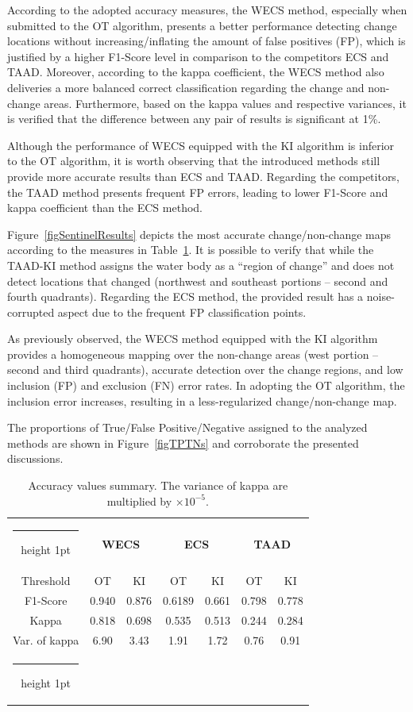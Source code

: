 \documentclass[journal]{IEEEtran}
\makeatletter
\newcommand{\thickhline}{\noalign {\ifnum 0=`}\fi \hrule height 1pt \futurelet \reserved@a \@xhline}
\makeatother
\begin{document}
According to the adopted accuracy measures, the WECS method, especially when submitted to the OT algorithm, presents a better performance detecting change locations without increasing/inflating the amount of false positives (FP), which is justified by a higher F1-Score level in comparison to the competitors ECS and TAAD. 
Moreover, according to the kappa coefficient, the WECS method also deliveries a more balanced correct classification regarding the change and non-change areas.
Furthermore, based on the kappa values and respective variances, it is verified that the difference between any pair of results is significant at 1\%.

Although the performance of WECS equipped with the KI algorithm is inferior to the OT algorithm, it is worth observing that the introduced methods still provide more accurate results than ECS and TAAD.
Regarding the competitors, the TAAD method presents frequent FP errors, leading to lower F1-Score and kappa coefficient than the ECS method.



Figure~\ref{figSentinelResults} depicts the most accurate change/non-change maps according to the measures in Table~\ref{tabAccExpSentinel}.
It is possible to verify that while the TAAD-KI method assigns the water body as a ``region of change'' and does not detect locations that changed (northwest and southeast portions -- second and fourth quadrants).
Regarding the ECS method, the provided result has a noise-corrupted aspect due to the frequent FP classification points.

As previously observed, the WECS method equipped with the KI algorithm provides a homogeneous mapping over the non-change areas (west portion -- second and third quadrants), accurate detection over the change regions, and low inclusion (FP) and exclusion (FN) error rates. In adopting the OT algorithm, the inclusion error increases, resulting in a less-regularized change/non-change map.

The proportions of True/False Positive/Negative assigned to the analyzed methods are shown in Figure~\ref{figTPTNs} and corroborate the presented discussions.




\begin{table}[H]
\caption{Accuracy values summary. The variance of kappa are multiplied by $\times 10^{-5}$.}\label{tabAccExpSentinel}
\centering
\begin{tabular}{ccccccc}
\thickhline
 & \multicolumn{2}{c}{\textbf{WECS}} & \multicolumn{2}{c}{\textbf{ECS}} & \multicolumn{2}{c}{\textbf{TAAD}}\tabularnewline
Threshold & OT & KI & OT & KI & OT & KI\tabularnewline
\hline 
F1-Score & 0.940 & 0.876 & 0.6189 & 0.661 & 0.798 & 0.778\tabularnewline
Kappa & 0.818 & 0.698 & 0.535 & 0.513 & 0.244 & 0.284\tabularnewline
Var. of kappa & 6.90 & 3.43 & 1.91 & 1.72 & 0.76 & 0.91 \tabularnewline
\thickhline
\end{tabular}
\end{table}
\end{document}

